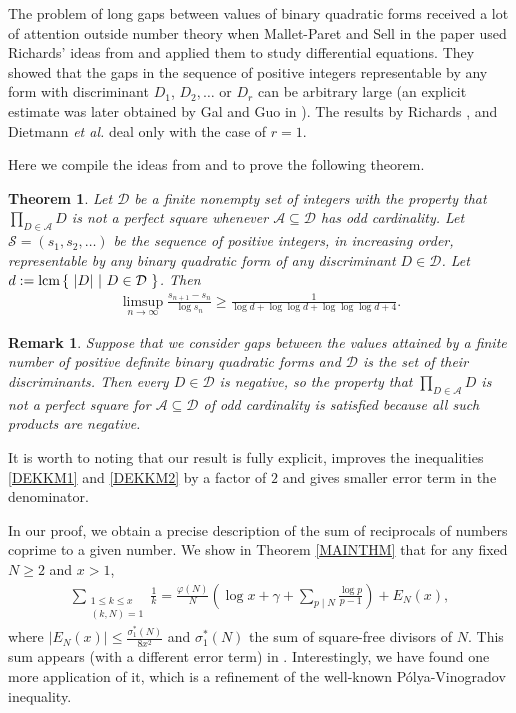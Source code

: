\documentclass[a4paper]{amsart}
\newtheorem{theorem}{Theorem}[section]
\newtheorem*{rem}{Remark}
\newcommand{\1}{\mathbbm{1}}
\newcommand{\lcm}{{\rm lcm}\hspace{0.05cm}}
\begin{document}
The problem of long gaps between values of binary quadratic forms received a lot of attention outside number theory when Mallet-Paret and Sell in the paper \cite{MS} used Richards' ideas from \cite{Richards} and applied them to study differential equations. They showed that the gaps in the sequence of positive integers representable by any form with discriminant $D_{1}$, $D_{2},\ldots$ or $D_{r}$ can be arbitrary large (an explicit estimate was later obtained by Gal and Guo in \cite{GG}). The results by Richards \cite{Richards}, and Dietmann \emph{et al.} \cite{DEKKM} deal only with the case of $r=1$.

Here we compile the ideas from \cite{MS} and \cite{DEKKM} to prove the following theorem.

\begin{theorem}\label{ThmGaps}
Let $\mathcal{D}$ be a finite nonempty set of integers with the property that $\prod_{D\in\mathcal{A}}D$ is not a perfect square whenever $\mathcal{A}\subseteq\mathcal{D}$ has odd cardinality. Let $\mathcal{S}=(s_{1}, s_{2},\ldots )$ be the sequence of positive integers, in increasing order, representable by any binary quadratic form of any discriminant $D\in\mathcal{D}$. Let $d:=\lcm\{\ |D| \ |\ D\in\mathcal{D}\ \}$. Then
\begin{align*}
\limsup_{n\to \infty}\frac{s_{n+1}-s_{n}}{\log s_{n}} \geq \frac{1}{\log d + \log\log d + \log\log\log d + 4}.
\end{align*}
\end{theorem}

\begin{rem}
Suppose that we consider gaps between the values attained by a finite number of positive definite binary quadratic forms and $\mathcal{D}$ is the set of their discriminants. Then every $D\in\mathcal{D}$ is negative, so the property that $\prod_{D\in\mathcal{A}}D$ is not a perfect square for $\mathcal{A}\subseteq\mathcal{D}$ of odd cardinality is satisfied because all such products are negative.
\end{rem}

It is worth to noting that our result is fully explicit, improves the inequalities \eqref{DEKKM1} and \eqref{DEKKM2} by a factor of $2$ and gives  smaller error term in the denominator. 

In our proof, we obtain a precise description of the sum of reciprocals of numbers coprime to a given number. We show in Theorem \ref{MAINTHM} that for any fixed $N\geq 2$ and $x>1$,
\begin{align*}
\sum_{\substack{1\leq k\leq x \\ (k,N)=1 }}\frac{1}{k} = \frac{\varphi (N)}{N}\left(\log x + \gamma + \sum_{p\mid N}\frac{\log p}{p-1}\right) + E_{N}(x),
\end{align*}  
where $|E_{N}(x)|\leq \frac{\sigma_{1}^{*}(N)}{8x^{2}}$ and $\sigma_{1}^{*}(N)$ the sum of square-free divisors of $N$. This sum appears (with a different error term) in \cite[2.1.1 Exercise 16(b)]{MV}. Interestingly, we have found one more application of it, which is a refinement of the well-known Pólya-Vinogradov inequality.
\end{document}

